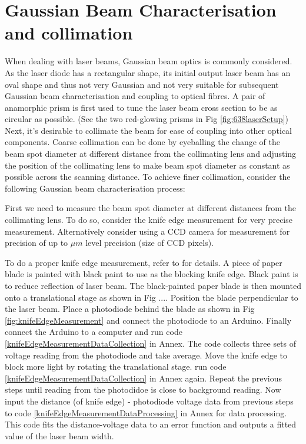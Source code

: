 \documentclass[12pt]{report}
\begin{document}
\section{Gaussian Beam Characterisation and collimation}
When dealing with laser beams, Gaussian beam optics is commonly considered. As the laser diode has a rectangular shape, its initial output laser beam has an oval shape and thus not very Gaussian and not very suitable for subsequent Gaussian beam characterisation and coupling to optical fibres. A pair of anamorphic prism is first used to tune the laser beam cross section to be as circular as possible. (See the two red-glowing prisms in Fig \ref{fig:638laserSetup}) Next, it's desirable to collimate the beam for ease of coupling into other optical components. Coarse collimation can be done by eyeballing the change of the beam spot diameter at different distance from the collimating lens and adjusting the position of the collimating lens to make beam spot diameter as constant as possible across the scanning distance. To achieve finer collimation, consider the following Gaussian beam characterisation process: 
\par
First we need to measure the beam spot diameter at different distances from the collimating lens. To do so, consider the knife edge measurement for very precise measurement. Alternatively consider using a CCD camera for measurement for precision of up to $\mu m$ level precision (size of CCD pixels). 
\par
To do a proper knife edge measurement, refer to \cite{KnifeEdgeMeasurement} for details. A piece of paper blade is painted with black paint to use as the blocking knife edge. Black paint is to reduce reflection of laser beam. The black-painted paper blade is then mounted onto a translational stage as shown in Fig .... Position the blade perpendicular to the laser beam. Place a photodiode behind the blade as shown in Fig \ref{fig:knifeEdgeMeasurement} and connect the photodiode to an Arduino. Finally connect the Arduino to a computer and run code \ref{knifeEdgeMeasurementDataCollection} in Annex. The code collects three sets of voltage reading from the photodiode and take average. Move the knife edge to block more light by rotating the translational stage. run code \ref{knifeEdgeMeasurementDataCollection} in Annex again. Repeat the previous steps until reading from the photodidoe is close to background reading. Now input the distance (of knife edge) - photodiode voltage data from previous steps to code \ref{knifeEdgeMeasurementDataProcessing} in Annex for data processing. This code fits the distance-voltage data to an error function and outputs a fitted value of the laser beam width. 
\end{document}
